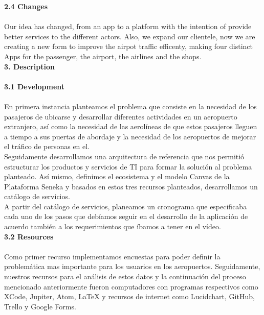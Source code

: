 \documentclass[]{article}
\begin{document}
\Large{\textbf{2.4 Changes}\\}\\
Our idea has changed, from an app to a platform with the intention of provide better services to the different actors. Also, we expand our clientele, now we are creating a new form to improve the airpot traffic efficenty, making four distinct Apps for the passenger, the airport, the airlines and the shops.\\
[0.7cm]

\Large{\textbf{3. Description}\\}\\

\Large{\textbf{3.1 Development}\\}\\

En primera instancia planteamos el problema que consiste en la necesidad de los pasajeros de ubicarse y desarrollar diferentes actividades en un aeropuerto extranjero, así como la necesidad de las aerolíneas de que estos pasajeros lleguen a tiempo a sus puertas de abordaje y la necesidad de los aeropuertos de mejorar el tráfico de personas en el.\\

Seguidamente desarrollamos una arquitectura de referencia que nos permitió estructurar los productos y servicios de TI para formar la solución al problema planteado. Así mismo, definimos el ecosistema y el modelo Canvas de la Plataforma Seneka y basados en estos tres recursos planteados, desarrollamos un catálogo de servicios.\\

A partir del catálogo de servicios, planeamos un cronograma que especificaba cada uno de los pasos que debíamos seguir en el desarrollo de la aplicación de acuerdo también a los requerimientos que íbamos a tener en el vídeo.\\
[0.6cm]

\Large{\textbf{3.2 Resources}\\}\\

Como primer recurso implementamos encuestas para poder definir la problemática mas importante para los usuarios en los aeropuertos. Seguidamente, nuestros recursos para el análisis de estos datos y la continuación del proceso mencionado anteriormente fueron computadores con programas respectivos como XCode, Jupiter, Atom, LaTeX y recursos de internet como Lucidchart, GitHub, Trello y Google Forms.\\
\end{document}
